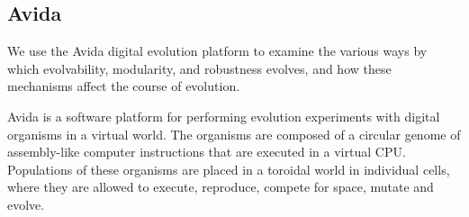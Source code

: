 \subsection{Avida}

We use the Avida digital evolution platform to examine the various ways by which evolvability, modularity, and robustness evolves, and how these mechanisms affect the course of evolution.

Avida is a software platform for performing evolution experiments with digital organisms in a virtual world. The organisms are composed of a circular genome of assembly-like computer instructions that are executed in a virtual CPU. Populations of these organisms are placed in a toroidal world in individual cells, where they are allowed to execute, reproduce, compete for space, mutate and evolve. 
 
